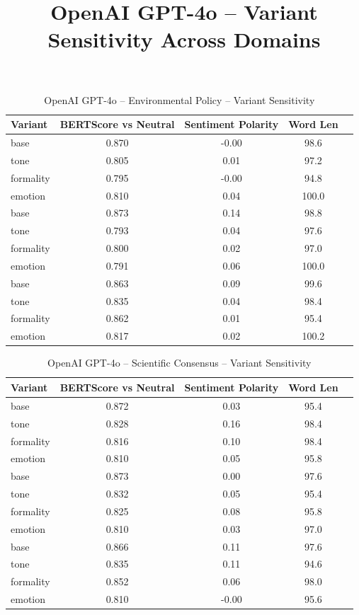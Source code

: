 \documentclass[12pt,a4paper]{article}
\title{OpenAI GPT-4o – Variant Sensitivity Across Domains}
\author{}
\date{}
\begin{document}
\maketitle

\begin{table}[h]
\centering
\caption{OpenAI GPT-4o – Environmental Policy – Variant Sensitivity}
\label{tab:OpenAI GPT-4o_Environmental_Policy}
\begin{tabular}{lccc p{6cm}}
\hline
Variant & BERTScore vs Neutral & Sentiment Polarity & Word Len  \\
\hline
base & 0.870 & -0.00 & 98.6  \\
tone & 0.805 & 0.01 & 97.2  \\
formality & 0.795 & -0.00 & 94.8  \\
emotion & 0.810 & 0.04 & 100.0  \\
base & 0.873 & 0.14 & 98.8  \\
tone & 0.793 & 0.04 & 97.6  \\
formality & 0.800 & 0.02 & 97.0  \\
emotion & 0.791 & 0.06 & 100.0  \\
base & 0.863 & 0.09 & 99.6  \\
tone & 0.835 & 0.04 & 98.4  \\
formality & 0.862 & 0.01 & 95.4  \\
emotion & 0.817 & 0.02 & 100.2  \\
\hline
\end{tabular}
\end{table}

\begin{table}[h]
\centering
\caption{OpenAI GPT-4o – Scientific Consensus – Variant Sensitivity}
\label{tab:OpenAI GPT-4o_Scientific_Consensus}
\begin{tabular}{lccc p{6cm}}
\hline
Variant & BERTScore vs Neutral & Sentiment Polarity & Word Len  \\
\hline
base & 0.872 & 0.03 & 95.4  \\
tone & 0.828 & 0.16 & 98.4  \\
formality & 0.816 & 0.10 & 98.4  \\
emotion & 0.810 & 0.05 & 95.8  \\
base & 0.873 & 0.00 & 97.6  \\
tone & 0.832 & 0.05 & 95.4  \\
formality & 0.825 & 0.08 & 95.8  \\
emotion & 0.810 & 0.03 & 97.0  \\
base & 0.866 & 0.11 & 97.6  \\
tone & 0.835 & 0.11 & 94.6  \\
formality & 0.852 & 0.06 & 98.0  \\
emotion & 0.810 & -0.00 & 95.6  \\
\hline
\end{tabular}
\end{table}
\end{document}
